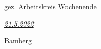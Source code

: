 \documentclass[a5paper,ngerman]{scrartcl}
\date{\today}
\begin{document}

\begin{minipage}[t]{0.47\textwidth}
\underline{\hspace{7em}}

{\small gez. Arbeitskreis Wochenende}
\end{minipage}
\begin{minipage}[t]{0.47\textwidth}
\hfill
\underline{\normalsize\hspace{4em}\emph{21.5.2022}\hspace{0.1em}}

\hfill{\small Bamberg}
\end{minipage}
\end{document}
